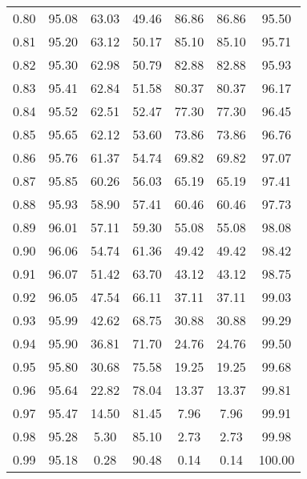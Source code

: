 \begin{tabular}{|c|c|c|c|c|c|c|}
      0.80 &     95.08 &     63.03 &      49.46 &   86.86 &      86.86 &         95.50 \\
      0.81 &     95.20 &     63.12 &      50.17 &   85.10 &      85.10 &         95.71 \\
      0.82 &     95.30 &     62.98 &      50.79 &   82.88 &      82.88 &         95.93 \\
      0.83 &     95.41 &     62.84 &      51.58 &   80.37 &      80.37 &         96.17 \\
      0.84 &     95.52 &     62.51 &      52.47 &   77.30 &      77.30 &         96.45 \\
      0.85 &     95.65 &     62.12 &      53.60 &   73.86 &      73.86 &         96.76 \\
      0.86 &     95.76 &     61.37 &      54.74 &   69.82 &      69.82 &         97.07 \\
      0.87 &     95.85 &     60.26 &      56.03 &   65.19 &      65.19 &         97.41 \\
      0.88 &     95.93 &     58.90 &      57.41 &   60.46 &      60.46 &         97.73 \\
      0.89 &     96.01 &     57.11 &      59.30 &   55.08 &      55.08 &         98.08 \\
      0.90 &     96.06 &     54.74 &      61.36 &   49.42 &      49.42 &         98.42 \\
      0.91 &     96.07 &     51.42 &      63.70 &   43.12 &      43.12 &         98.75 \\
      0.92 &     96.05 &     47.54 &      66.11 &   37.11 &      37.11 &         99.03 \\
      0.93 &     95.99 &     42.62 &      68.75 &   30.88 &      30.88 &         99.29 \\
      0.94 &     95.90 &     36.81 &      71.70 &   24.76 &      24.76 &         99.50 \\
      0.95 &     95.80 &     30.68 &      75.58 &   19.25 &      19.25 &         99.68 \\
      0.96 &     95.64 &     22.82 &      78.04 &   13.37 &      13.37 &         99.81 \\
      0.97 &     95.47 &     14.50 &      81.45 &    7.96 &       7.96 &         99.91 \\
      0.98 &     95.28 &      5.30 &      85.10 &    2.73 &       2.73 &         99.98 \\
      0.99 &     95.18 &      0.28 &      90.48 &    0.14 &       0.14 &        100.00 \\
\bottomrule
\end{tabular}
